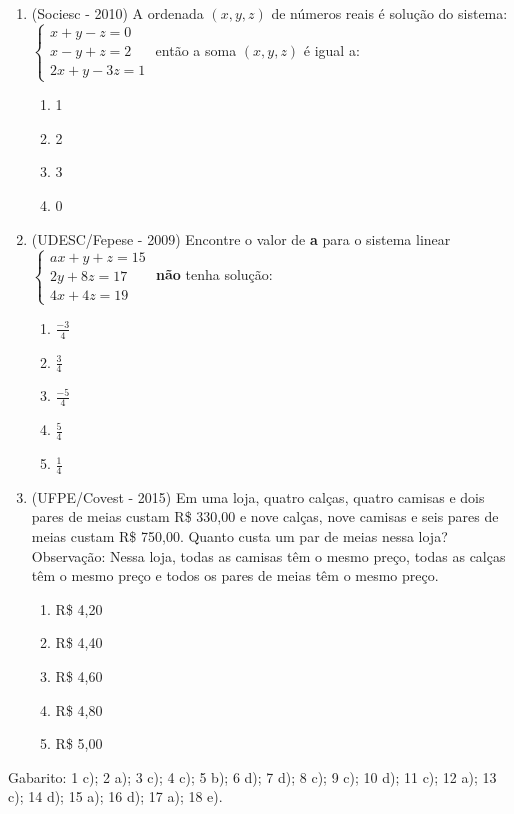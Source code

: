 \begin{enumerate}
 \item (Sociesc - 2010) A ordenada $(x, y, z)$ de números reais é solução do sistema:
  $\begin{cases}
    x+y-z=0 \\
    x-y+z=2 \\
    2x+y-3z=1
   \end{cases}$ então a soma $(x, y, z)$ é igual a:
  \begin{enumerate}
  \item 1
  \item 2
  \item 3
  \item 0
 \end{enumerate}

 \item (UDESC/Fepese - 2009) Encontre o valor de \textbf{a} para o sistema linear
 $\begin{cases}
    ax+y+z=15 \\
    2y+8z=17 \\
    4x+4z=19
   \end{cases}$
 \textbf{não} tenha solução:
  \begin{enumerate}
  \item $\frac{-3}{4}$
  \item $\frac{3}{4}$
  \item $\frac{-5}{4}$
  \item $\frac{5}{4}$
  \item $\frac{1}{4}$
 \end{enumerate}

 \item (UFPE/Covest - 2015) Em uma loja, quatro calças, quatro camisas e dois pares de meias custam R\$ 330,00 e nove calças, nove camisas e seis pares de meias custam R\$ 750,00. Quanto custa um par de meias nessa loja? Observação: Nessa loja, todas as camisas têm o mesmo preço, todas as calças têm o mesmo preço e todos os pares de meias têm o mesmo preço.
 \begin{enumerate}
  \item R\$ 4,20
  \item R\$ 4,40
  \item R\$ 4,60
  \item R\$ 4,80
  \item R\$ 5,00
 \end{enumerate}

\end{enumerate}

Gabarito: 1 c); 2 a); 3 c); 4 c); 5 b); 6 d); 7 d); 8 c); 9 c); 10 d); 11 c); 12 a); 13 c); 14 d); 15 a); 16 d); 17 a); 18 e).

